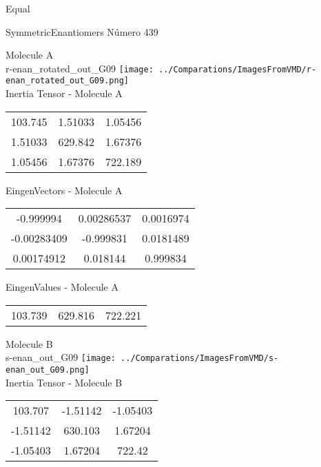 \begin{center}
\vtab
\vtab
\textcolor{NavyBlue}{\Large Equal}
\end{center}

 \newpage

\vtab[-2cm]
\begin{center}
{\large SymmetricEnantiomers \tab Número 439}
\end{center}
\begin{multicols}{2}
\begin{center}

Molecule A \\ 
r-enan\_rotated\_out\_G09
\texttt{[image: ../Comparations/ImagesFromVMD/r-enan\_rotated\_out\_G09.png]}
\\
Inertia Tensor - Molecule A \\
\vtab

\begin{tabular}{|c c c|}
103.745	 & 	1.51033	 & 	1.05456	 \\
1.51033	 & 	629.842	 & 	1.67376	 \\
1.05456	 & 	1.67376	 & 	722.189
\end{tabular}

\vtab
 EingenVectors - Molecule A     \\
\vtab
\begin{tabular}{|c c c|}
-0.999994	 & 	0.00286537	 & 	0.0016974	 \\
-0.00283409	 & 	-0.999831	 & 	0.0181489	 \\
0.00174912	 & 	0.018144	 & 	0.999834
\end{tabular}

\vtab
 EingenValues - Molecule A     \\
\vtab
\begin{tabular}{|c c c|}
103.739	 & 	629.816	 & 	722.221	 \\
\end{tabular}
\columnbreak

Molecule B \\ 
s-enan\_out\_G09
\texttt{[image: ../Comparations/ImagesFromVMD/s-enan\_out\_G09.png]}
\\
Inertia Tensor - Molecule B \\
\vtab

\begin{tabular}{|c c c|}
103.707	 & 	-1.51142	 & 	-1.05403	 \\
-1.51142	 & 	630.103	 & 	1.67204	 \\
-1.05403	 & 	1.67204	 & 	722.42
\end{tabular}


\end{center}
\end{multicols}
